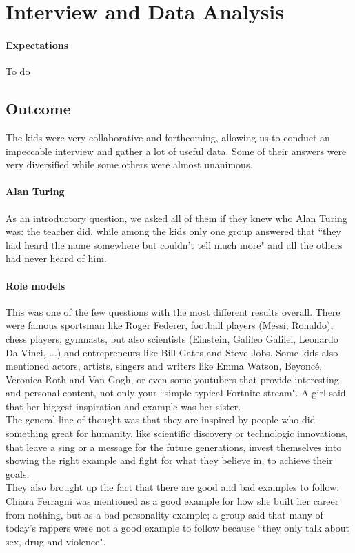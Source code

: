 \documentclass[12pt]{scrartcl}
\begin{document}
\section*{Interview and Data Analysis}
	\paragraph{Expectations}
		To do
		
	\subsection*{Outcome}
		The kids were very collaborative and forthcoming, allowing us to conduct an impeccable interview and gather a lot of useful data. Some of their answers were very diversified while some others were almost unanimous.
		
		\paragraph{Alan Turing} As an introductory question, we asked all of them if they knew who Alan Turing was: the teacher did, while among the kids only one group answered that ``they had heard the name somewhere but couldn't tell much more" and all the others had never heard of him. 
		
		\paragraph{Role models} This was one of the few questions with the most different results overall. There were famous sportsman like Roger Federer, football players (Messi, Ronaldo), chess players, gymnasts, but also scientists (Einstein, Galileo Galilei, Leonardo Da Vinci, ...) and entrepreneurs like Bill Gates and Steve Jobs. Some kids also mentioned actors, artists, singers and writers like Emma Watson, Beyoncé, Veronica Roth and Van Gogh, or even some youtubers that provide interesting and personal content, not only your ``simple typical Fortnite stream". A girl said that her biggest inspiration and example was her sister.\\
		The general line of thought was that they are inspired by people who did something great for humanity, like scientific discovery or technologic innovations, that leave a sing or a message for the future generations, invest themselves into showing the right example and fight for what they believe in, to achieve their goals.\\
		They also brought up the fact that there are good and bad examples to follow: Chiara Ferragni was mentioned as a good example for how she built her career from nothing, but as a bad personality example; a group said that many of today's rappers were not a good example to follow because ``they only talk about sex, drug and violence".
		
\end{document}
